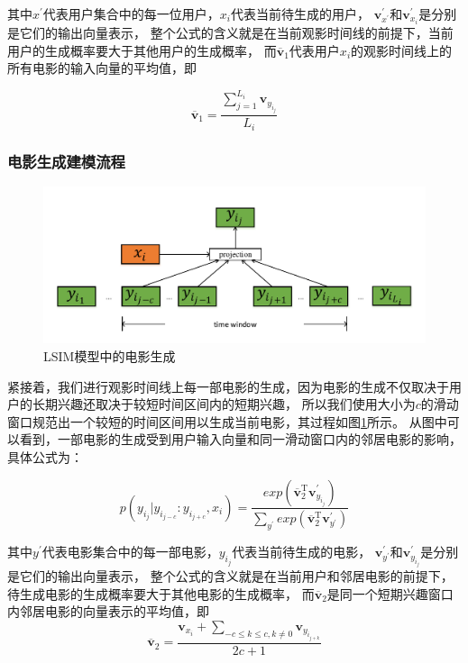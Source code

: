 其中$x^{'}$代表用户集合中的每一位用户，$x_i$代表当前待生成的用户，
$\mathbf{v}_{x^{'}}^{'}$和$\mathbf{v}_{x_i}^{'}$是分别是它们的输出向量表示，
整个公式的含义就是在当前观影时间线的前提下，当前用户的生成概率要大于其他用户的生成概率，
而$\overline{\mathbf{v}}_{1}$代表用户$x_i$的观影时间线上的所有电影的输入向量的平均值，即

\begin{equation}
\overline{\mathbf{v}}_{1} = \frac{\sum_{j=1}^{L_i} \mathbf{v}_{y_{i_j}}}{L_i}
\end{equation}

\subsubsection{电影生成建模流程}
\begin{figure}[htbp]
    \centering
    \includegraphics[scale=0.6]{images/doc2vec2.pdf}
    \caption{LSIM模型中的电影生成}
    \label{fig:doc2vec2}
\end{figure}

紧接着，我们进行观影时间线上每一部电影的生成，因为电影的生成不仅取决于用户的长期兴趣还取决于较短时间区间内的短期兴趣，
所以我们使用大小为$c$的滑动窗口规范出一个较短的时间区间用以生成当前电影，其过程如图\ref{fig:doc2vec2}所示。
从图中可以看到，一部电影的生成受到用户输入向量和同一滑动窗口内的邻居电影的影响，具体公式为：

\begin{equation}
p(y_{i_j} | y_{i_{j-c}} : y_{i_{j+c}}, x_i) =
\frac
{
    exp( \overline{\mathbf{v}}_{2}^{\mathrm{T}} \mathbf{v}_{y_{i_j}}^{'} )
}
{
    \sum_{y^{'}} exp( \overline{\mathbf{v}}_{2}^{\mathrm{T}} \mathbf{v}_{y^{'}}^{'} )
}
\end{equation}

其中$y^{'}$代表电影集合中的每一部电影，${y_{i_j}}$代表当前待生成的电影，
$\mathbf{v}_{y^{'}}^{'}$和$\mathbf{v}_{y_{i_j}}^{'}$是分别是它们的输出向量表示，
整个公式的含义就是在当前用户和邻居电影的前提下，待生成电影的生成概率要大于其他电影的生成概率，
而$\overline{\mathbf{v}}_{2}$是同一个短期兴趣窗口内邻居电影的向量表示的平均值，即
\begin{equation}
\overline{\mathbf{v}}_{2} = \frac{
    \mathbf{v}_{x_i} + 
    \sum_{-c \leq k \leq c, k \not= 0}{\mathbf{v}_{y_{i_{j+k}}}}
}{2c+1}
\end{equation}

